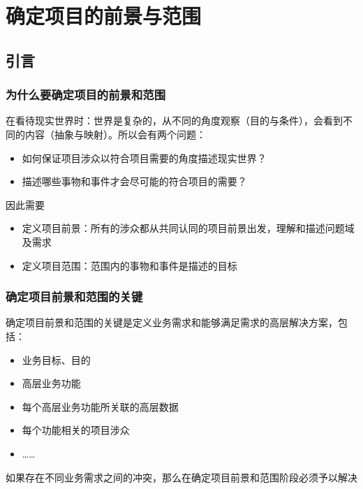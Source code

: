 \section{确定项目的前景与范围}

\subsection{引言}

\subsubsection{为什么要确定项目的前景和范围}
在看待现实世界时：世界是复杂的，从不同的角度观察（目的与条件），会看到不同的内容（抽象与映射）。所以会有两个问题：
\begin{itemize}
    \item 如何保证项目涉众以符合项目需要的角度描述现实世界？
    \item 描述哪些事物和事件才会尽可能的符合项目的需要？
\end{itemize}

因此需要
\begin{itemize}
    \item 定义项目前景：所有的涉众都从共同认同的项目前景出发，理解和描述问题域及需求
    \item 定义项目范围：范围内的事物和事件是描述的目标
\end{itemize}

\subsubsection{确定项目前景和范围的关键}
确定项目前景和范围的关键是定义业务需求和能够满足需求的高层解决方案，包括：
\vspace{-0.8em}
	\begin{multicols}{3}
        \begin{itemize}
            \item 业务目标、目的
            \item 高层业务功能
            \item 每个高层业务功能所关联的高层数据
            \item 每个功能相关的项目涉众
            \item ……
        \end{itemize}
	\end{multicols}
\vspace{-1em}
如果存在不同业务需求之间的冲突，那么在确定项目前景和范围阶段必须予以解决

